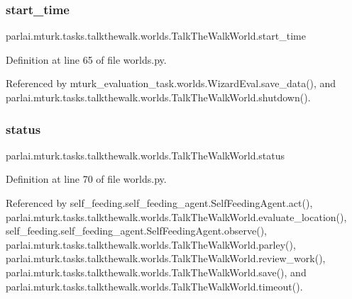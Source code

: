 \mbox{\label{classparlai_1_1mturk_1_1tasks_1_1talkthewalk_1_1worlds_1_1TalkTheWalkWorld_ac17a27e2e6dc10f14c590a3cc8c4bd07}} 
\subsubsection{\texorpdfstring{start\+\_\+time}{start\_time}}
{\footnotesize\ttfamily parlai.\+mturk.\+tasks.\+talkthewalk.\+worlds.\+Talk\+The\+Walk\+World.\+start\+\_\+time}



Definition at line 65 of file worlds.\+py.



Referenced by mturk\+\_\+evaluation\+\_\+task.\+worlds.\+Wizard\+Eval.\+save\+\_\+data(), and parlai.\+mturk.\+tasks.\+talkthewalk.\+worlds.\+Talk\+The\+Walk\+World.\+shutdown().

\mbox{\label{classparlai_1_1mturk_1_1tasks_1_1talkthewalk_1_1worlds_1_1TalkTheWalkWorld_ac5f392221c3715b3cf251c2b5fb42fa3}} 
\subsubsection{\texorpdfstring{status}{status}}
{\footnotesize\ttfamily parlai.\+mturk.\+tasks.\+talkthewalk.\+worlds.\+Talk\+The\+Walk\+World.\+status}



Definition at line 70 of file worlds.\+py.



Referenced by self\+\_\+feeding.\+self\+\_\+feeding\+\_\+agent.\+Self\+Feeding\+Agent.\+act(), parlai.\+mturk.\+tasks.\+talkthewalk.\+worlds.\+Talk\+The\+Walk\+World.\+evaluate\+\_\+location(), self\+\_\+feeding.\+self\+\_\+feeding\+\_\+agent.\+Self\+Feeding\+Agent.\+observe(), parlai.\+mturk.\+tasks.\+talkthewalk.\+worlds.\+Talk\+The\+Walk\+World.\+parley(), parlai.\+mturk.\+tasks.\+talkthewalk.\+worlds.\+Talk\+The\+Walk\+World.\+review\+\_\+work(), parlai.\+mturk.\+tasks.\+talkthewalk.\+worlds.\+Talk\+The\+Walk\+World.\+save(), and parlai.\+mturk.\+tasks.\+talkthewalk.\+worlds.\+Talk\+The\+Walk\+World.\+timeout().

